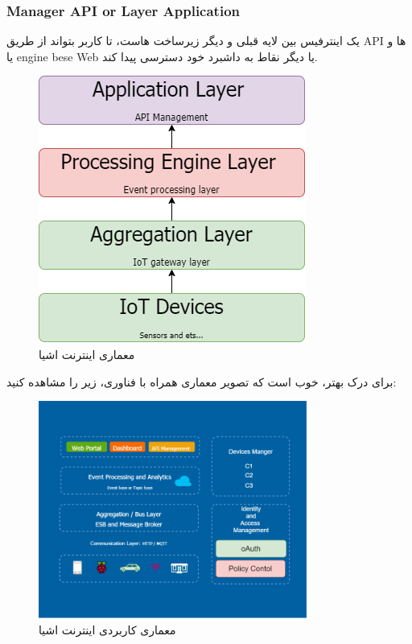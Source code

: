 \documentclass[10pt, a4paper]{article}
\begin{document}
\subsubsection{Manager API or Layer Application}
یک اینترفیس بین لایه قبلی و دیگر زیرساخت هاست، تا کاربر بتواند از طریق API ها و یا engine bese Web یا دیگر نقاط به داشبرد خود دسترسی پیدا کند.



\begin{figure}[htbp]
	\centerline{\includegraphics[scale=.5]{img/tblArtLevel.png}}
	\caption{معماری اینترنت اشیا}
	\label{fig}
\end{figure}

برای درک بهتر، خوب است که تصویر معماری همراه با فناوری، زیر را مشاهده کنید:

\begin{figure}[htbp]
	\centerline{\includegraphics[width=250pt]{img/IoTArti-Applicability}}
	\caption{معماری کاربردی اینترنت اشیا}
	\label{fig}
\end{figure}
\end{document}
